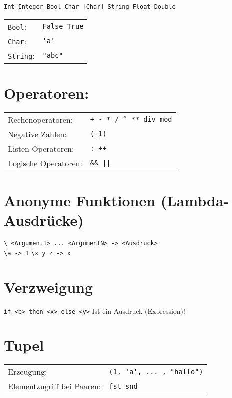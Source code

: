 \documentclass[12pt,a4paper]{article}
\begin{document}
\verb#Int Integer Bool Char [Char] String Float Double# \\

\begin{tabular}{ll}
\verb#Bool#: & \lstinline!False True! \\
\verb#Char#: & \lstinline!'a'! \\
\verb#String#: & \lstinline!"abc"! \\
\end{tabular}


\section{Operatoren:}

\begin{tabular}{ll}
Rechenoperatoren: & \verb#+ - * / ^ ** div mod# \\
Negative Zahlen: & \verb#(-1)# \\
Listen-Operatoren: & \verb#: ++# \\
Logische Operatoren: & \verb#&& ||# \\
\end{tabular}

\section{Anonyme Funktionen (Lambda-Ausdrücke)}

\verb#\ <Argument1> ... <ArgumentN> -> <Ausdruck># \\

\verb#\a -> 1#  \hspace{2cm} \verb#\x y z -> x#


\section{Verzweigung}

\verb#if <b> then <x> else <y>#   \hspace{2cm} Ist ein Ausdruck (Expression)!

\section{Tupel}

\begin{tabular}{ll}
Erzeugung: & \verb#(1, 'a', ... , "hallo")# \\
Elementzugriff bei Paaren: & \verb#fst snd# \\
\end{tabular}
\end{document}
